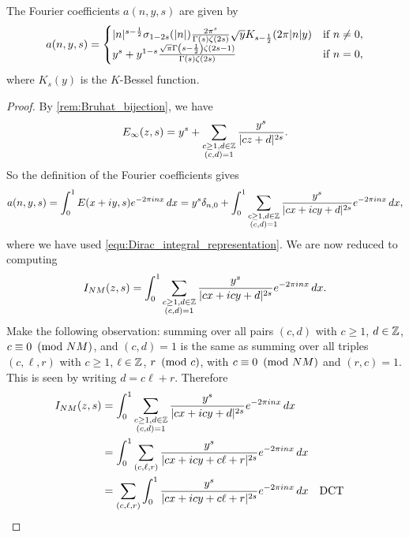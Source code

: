       \begin{proposition}\label{prop:Fourier_coefficients_of_real-analytic_Eisenstein_series}
        The Fourier coefficients $a(n,y,s)$ are given by
        \[
          a(n,y,s) = \begin{cases} |n|^{s-\frac{1}{2}}\sigma_{1-2s}(|n|)\frac{2\pi^{s}}{\Gamma(s)\zeta(2s)}\sqrt{y}K_{s-\frac{1}{2}}(2\pi|n|y) & \text{if $n \neq 0$}, \\ y^{s}+y^{1-s}\frac{\sqrt{\pi}\Gamma\left(s-\frac{1}{2}\right)\zeta(2s-1)}{\Gamma(s)\zeta(2s)} & \text{if $n = 0$}, \end{cases}
        \]
        where $K_{s}(y)$ is the $K$-Bessel function.
      \end{proposition}
      \begin{proof}
        By \cref{rem:Bruhat_bijection}, we have
        \[
          E_{\infty}(z,s) = y^{s}+\sum_{\substack{c \ge 1, d \in \mathbb{Z} \\ (c,d) = 1}}\frac{y^{s}}{|cz+d|^{2s}}.
        \]
        So the definition of the Fourier coefficients gives
        \begin{equation}\label{equ:real-analytic_Eisenstein_fourier_coefficient_definition}
          a(n,y,s) = \int_{0}^{1}E(x+iy,s)e^{-2\pi inx}\,dx = y^{s}\delta_{n,0}+\int_{0}^{1}\sum_{\substack{c \ge 1, d \in \mathbb{Z} \\ (c,d) = 1}}\frac{y^{s}}{|cx+icy+d|^{2s}}e^{-2\pi inx}\,dx,
        \end{equation}
        where we have used \cref{equ:Dirac_integral_representation}. We are now reduced to computing
        \[
          I_{NM}(z,s) = \int_{0}^{1}\sum_{\substack{c \ge 1, d \in \mathbb{Z} \\ (c,d) = 1}}\frac{y^{s}}{|cx+icy+d|^{2s}}e^{-2\pi inx}\,dx.
        \]
        Make the following observation: summing over all pairs $(c,d)$ with $c \ge 1$, $d \in \mathbb{Z}$, $c \equiv 0 \ \left(\text{mod }NM\right)$, and $(c,d) = 1$ is the same as summing over all triples $(c,\ell,r)$ with $c \ge 1$, $\ell \in \mathbb{Z}$, $r \ \left(\text{mod }c\right)$, with $c \equiv 0 \ \left(\text{mod }NM\right)$ and $(r,c) = 1$. This is seen by writing $d = c\ell+r$. Therefore
        \begin{align*}
          I_{NM}(z,s) &= \int_{0}^{1}\sum_{\substack{c \ge 1, d \in \Z \\ (c,d) = 1}}\frac{y^{s}}{|cx+icy+d|^{2s}}e^{-2\pi inx}\,dx \\
          &= \int_{0}^{1}\sum_{(c,\ell,r)}\frac{y^{s}}{|cx+icy+c\ell+r|^{2s}}e^{-2\pi inx}\,dx \\
          &= \sum_{(c,\ell,r)}\int_{0}^{1}\frac{y^{s}}{|cx+icy+c\ell+r|^{2s}}e^{-2\pi inx}\,dx &&\text{DCT} \\

\end{align*}
\end{proof}

